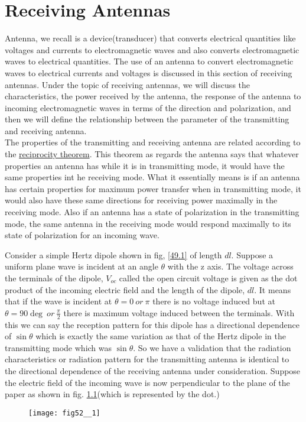 \chapter{Receiving Antennas}
Antenna, we recall is a device(transducer) that converts electrical quantities like voltages and currents to electromagnetic waves and also converts electromagnetic waves to electrical quantities. The use of an antenna to convert electromagnetic waves to electrical currents and voltages is discussed in this section of receiving antennas. Under the topic of receiving antennas, we will discuss the characteristics, the power received by the antenna, the response of the antenna to incoming electromagnetic waves in terms of the direction and polarization, and then we will define the relationship between the parameter of the transmitting and receiving antenna.\\

The properties of the transmitting and receiving antenna are related according to the \underline{reciprocity theorem}. This theorem as regards the antenna says that whatever properties an antenna has while it is in transmitting mode, it would have the same properties int he receiving mode. What it essentially means is if an antenna has certain properties for maximum power transfer when in transmitting mode, it would also have these same directions for receiving power maximally in the receiving mode. Also if an antenna has a state of polarization in the transmitting mode, the same antenna in the receiving mode would respond maximally to its state of polarization for an incoming wave.

Consider a simple Hertz dipole shown in fig, \ref{49.1} of length $dl$. Suppose a uniform plane wave is incident at an angle $\theta$ with the z axis. The voltage across the terminals of the dipole, $V_{oc}$ called the open circuit voltage is given as the dot product of the incoming electric field and the length of the dipole, $dl$. It means that if the wave is incident at $\theta = 0\ or\ \pi$ there is no voltage induced but at $\theta = 90\deg\ or\ \frac{\pi}{2}$ there is maximum voltage induced between the terminals. With this we can say the reception pattern for this dipole has a directional dependence of $\sin\theta$ which is exactly the same variation as that of the Hertz dipole in the transmitting mode which was $\sin\theta$. So we have a validation that the radiation characteristics or radiation pattern for the transmitting antenna is identical to the directional dependence of the receiving antenna under consideration. Suppose the electric field of the incoming wave is now perpendicular to the plane of the paper as shown in fig. \ref{49.2}(which is represented by the dot.)
\begin{figure}
	\centering
	\texttt{[image: fig52\_\_1]}
	\caption{}
	\label{49.2}
\end{figure}

